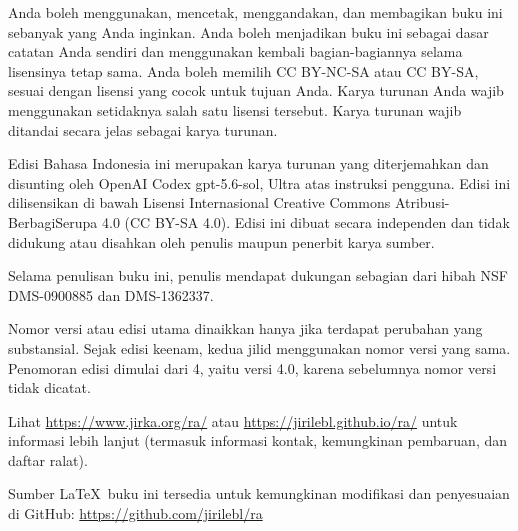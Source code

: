 \documentclass[12pt]{book}
\newcommand{\ignore}[1]{}
\theoremstyle{plain}
\theoremstyle{remark}
\theoremstyle{definition}
\theoremstyle{exercise}
\theoremstyle{example}
\begin{document}
\bigskip

\noindent
Anda boleh menggunakan, mencetak, menggandakan, dan membagikan buku ini
sebanyak yang Anda inginkan. Anda boleh menjadikan buku ini sebagai dasar
catatan Anda sendiri dan menggunakan kembali bagian-bagiannya selama lisensinya
tetap sama. Anda boleh memilih CC BY-NC-SA atau CC BY-SA, sesuai dengan lisensi
yang cocok untuk tujuan Anda. Karya turunan Anda wajib menggunakan setidaknya
salah satu lisensi tersebut. Karya turunan wajib ditandai secara jelas sebagai
karya turunan.

\bigskip

\noindent
Edisi Bahasa Indonesia ini merupakan karya turunan yang diterjemahkan dan
disunting oleh OpenAI Codex gpt-5.6-sol, Ultra atas instruksi pengguna. Edisi ini dilisensikan di bawah
Lisensi Internasional Creative Commons Atribusi-BerbagiSerupa 4.0 (CC BY-SA
4.0). Edisi ini dibuat secara independen dan tidak didukung atau disahkan oleh
penulis maupun penerbit karya sumber.

\bigskip

\noindent
Selama penulisan buku ini, penulis mendapat dukungan sebagian dari hibah NSF
DMS-0900885 dan DMS-1362337.

\bigskip

\noindent
Nomor versi atau edisi utama dinaikkan hanya jika terdapat perubahan yang
substansial. Sejak edisi keenam, kedua jilid menggunakan nomor versi yang sama.
Penomoran edisi dimulai dari 4, yaitu versi 4.0, karena sebelumnya nomor versi
tidak dicatat.  %

\bigskip

\noindent
Lihat \url{https://www.jirka.org/ra/} atau \url{https://jirilebl.github.io/ra/}
untuk informasi lebih lanjut (termasuk informasi kontak, kemungkinan
pembaruan, dan daftar ralat).


\bigskip

\noindent
Sumber \LaTeX\ buku ini tersedia untuk kemungkinan modifikasi dan penyesuaian
di GitHub: \url{https://github.com/jirilebl/ra}



\tableofcontents
{}

\newpage

\end{document}
